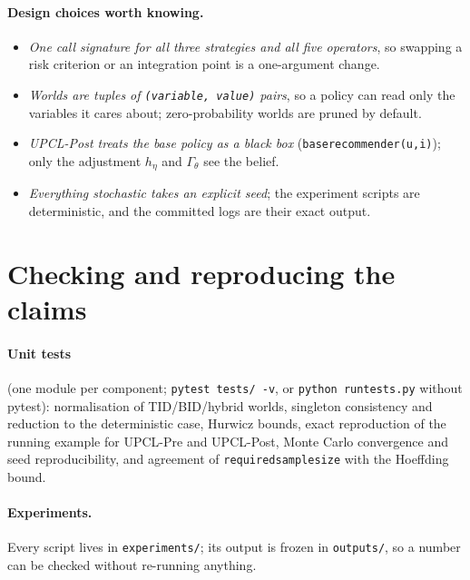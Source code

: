 \documentclass[11pt]{article}
\newcommand{\code}[1]{{\renewcommand{\_}{\textunderscore\hspace{0pt}}\texttt{#1}}}
\begin{document}
\paragraph{Design choices worth knowing.}
\begin{itemize}
\item \emph{One call signature for all three strategies and all five operators}, so swapping a risk criterion or an integration point is a one-argument change.
\item \emph{Worlds are tuples of \code{(variable, value)} pairs}, so a policy can read only the variables it cares about; zero-probability worlds are pruned by default.
\item \emph{UPCL-Post treats the base policy as a black box} (\code{base\_recommender(u,i)}); only the adjustment $h_\eta$ and $\Gamma_\theta$ see the belief.
\item \emph{Everything stochastic takes an explicit seed}; the experiment scripts are deterministic, and the committed logs are their exact output.
\end{itemize}

\section{Checking and reproducing the claims}

\paragraph{Unit tests} (one module per component; \code{pytest tests/ -v}, or \code{python run\_tests.py} without pytest): normalisation of TID/BID/hybrid worlds, singleton consistency and reduction to the deterministic case, Hurwicz bounds, exact reproduction of the running example for UPCL-Pre and UPCL-Post, Monte Carlo convergence and seed reproducibility, and agreement of \code{required\_sample\_size} with the Hoeffding bound.

\paragraph{Experiments.} Every script lives in \code{experiments/}; its output is frozen in \code{outputs/}, so a number can be checked without re-running anything.
\end{document}
